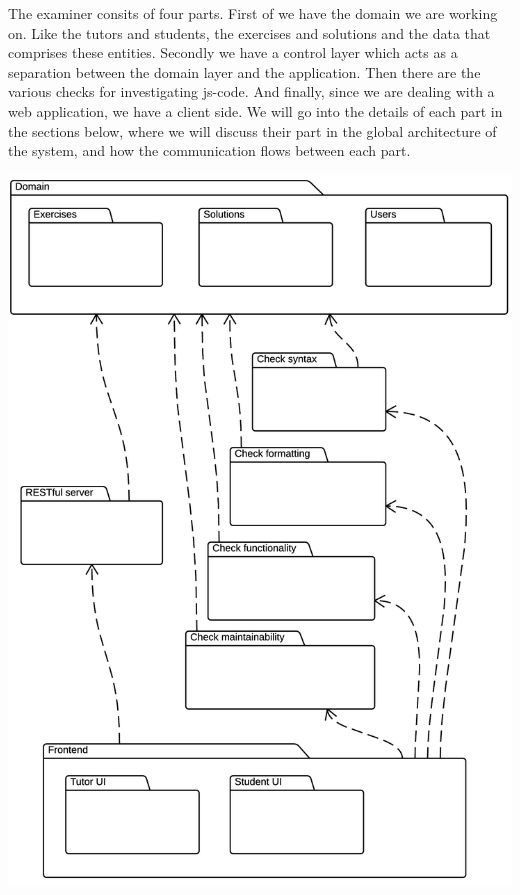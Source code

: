 %

The \gls{examiner} consits of four parts.
First of we have the domain we are working on.
Like the tutors and students, the exercises and solutions
and the data that comprises these entities.
Secondly we have a control layer
which acts as a separation between the domain layer and the application.
Then there are the various checks for investigating \gls{js-code}.
And finally, since we are dealing with a web application,
we have a client side.
We will go into the details of each part in the sections below,
where we will discuss their part in the global architecture of the system,
and how the communication flows between each part.

\includegraphics[scale=0.75]{diagrams-images/architecture}

